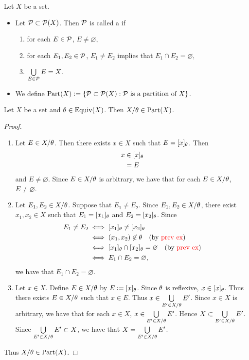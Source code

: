 \documentclass{book}
\begin{document}
	\begin{defn}
		Let $X$ be a set.
		\begin{itemize}
			\item Let $\mathcal{P} \subset \mathcal{P}(X)$. Then $\mathcal{P}$ is called a  if 
			\begin{enumerate}
				\item for each $E \in \mathcal{P}$, $E \neq \varnothing$, 
				\item for each $E_1, E_2 \in \mathcal{P}$, $E_1 \neq E_2$ implies that $E_1 \cap E_2 = \varnothing$,
				\item $\bigcup\limits_{E \in \mathcal{P}} E = X$.
			\end{enumerate}
			\item We define $\text{Part}(X) \vcentcolon= \{\mathcal{P} \subset \mathcal{P}(X): \text{$\mathcal{P}$ is a partition of $X$}\}$.
		\end{itemize}
	\end{defn}
	
	\begin{ex}
		Let $X$ be a set and $\theta \in \operatorname*{\text{Equiv}}(X)$. Then $X/\theta \in \text{Part}(X)$. 
	\end{ex}
	
	\begin{proof}\
		\begin{enumerate}
			\item Let $E \in X/\theta$. Then there exists $x \in X$ such that $E = [x]_{\theta}$. Then 
			\begin{align*}
				x
				& \in [x]_{\theta} \\
				& = E
			\end{align*}
			and $E \neq \varnothing$. Since $E \in X/\theta$ is arbitrary, we have that for each $E \in X/\theta$, $E \neq \varnothing$.
			\item Let $E_1, E_2 \in X/\theta$. Suppose that $E_1 \neq E_2$. Since $E_1, E_2 \in X/\theta$, there exist $x_1, x_2 \in X$ such that $E_1 = [x_1]_{\theta}$ and $E_2 = [x_2]_{\theta}$. Since 
			\begin{align*}
				E_1 \neq E_2
				& \iff [x_1]_{\theta} \neq [x_2]_{\theta} \\
				& \iff (x_1, x_2) \not \in \theta \quad \text{(by \textcolor{red}{prev ex})} \\
				& \iff [x_1]_{\theta} \cap [x_2]_{\theta} = \varnothing \quad \text{(by \textcolor{red}{prev ex})} \\
				& \iff E_1 \cap E_2 = \varnothing, 
			\end{align*} 
			we have that $E_1 \cap E_2 = \varnothing$. 
			\item Let $x \in X$. Define $E \in X/\theta$ by $E \vcentcolon= [x]_{\theta}$. Since $\theta$ is reflexive, $x \in [x]_{\theta}$. Thus there exists $E \in X/\theta$ such that $x \in E$. Thus $x \in \bigcup\limits_{E' \in X/\theta} E'$. Since $x \in X$ is arbitrary, we have that for each $x \in X$, $x \in \bigcup\limits_{E' \in X/\theta} E'$. Hence $X \subset \bigcup\limits_{E' \in X/\theta} E'$. Since $\bigcup\limits_{E' \in X/\theta} E' \subset X$, we have that $X =  \bigcup\limits_{E' \in X/\theta} E'$. 
		\end{enumerate}
		Thus $X/\theta \in \text{Part}(X)$.  
	\end{proof}
	
\end{document}
